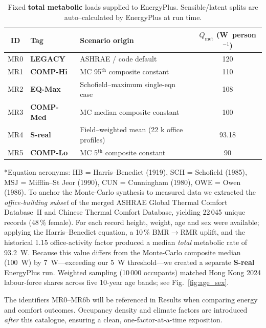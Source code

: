 \begin{table}[h!]
\centering
\caption{Fixed \textbf{total metabolic} loads supplied to EnergyPlus.
         Sensible/latent splits are auto–calculated by EnergyPlus at run time.}
\label{tab:mr_cases}
\begin{tabular}{@{}cllc@{}}
\toprule
ID & Tag & Scenario origin & $Q_\text{met}$ (W~person$^{-1}$) \\ \midrule
MR0 & \textbf{LEGACY}   & ASHRAE / code default                           & 120 \\
MR1 & \textbf{COMP-Hi}  & MC 95$^{\text{th}}$ composite constant          & 110 \\
MR2 & \textbf{EQ-Max}   & Schofield–maximum single-eqn case               & 108 \\
MR3 & \textbf{COMP-Med} & MC median composite constant                    & 100 \\
MR4 & \textbf{S-real}   & Field–weighted mean (22 k office profiles)      & 93.18 \\
MR5 & \textbf{COMP-Lo}  & MC 5$^{\text{th}}$ composite constant           & 90 \\ \bottomrule
\end{tabular}
\end{table}

\noindent
*Equation acronyms: HB = Harris–Benedict (1919), SCH = Schofield
(1985), MSJ = Mifflin–St Jeor (1990), CUN = Cunningham (1980),
OWE = Owen (1986).
To anchor the Monte-Carlo synthesis to measured data we extracted the
\emph{office-building subset} of the merged ASHRAE Global Thermal Comfort
Database~II and Chinese Thermal Comfort Database, yielding
22\,045 unique records (48\,\% female).
For each record height, weight, age and sex were available; applying the
Harris--Benedict equation, a 10\,\% BMR$\rightarrow$RMR uplift, and the
historical 1.15 office-activity factor produced a median
\emph{total} metabolic rate of \SI{93.2}{W}.
Because this value differs from the Monte-Carlo composite median
(\SI{100}{W}) by \SI{7}{W}—exceeding our \SI{5}{W} threshold—we created a
separate \textbf{S-real} EnergyPlus run.
Weighted sampling (10\,000 occupants) matched Hong Kong 2024
labour-force shares across five 10-year age bands; see Fig.~\ref{fig:age_sex}.


The identifiers MR0–MR6b will be referenced in Results when comparing energy and comfort outcomes.  Occupancy density and climate factors are introduced \emph{after} this catalogue, ensuring a clean,
one-factor-at-a-time exposition.



